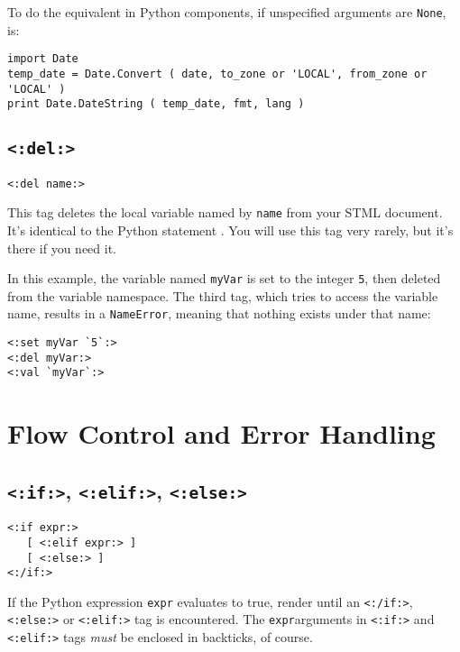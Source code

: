 \documentclass{manual}
\begin{document}
To do the equivalent in Python components, if unspecified arguments are \texttt{None}, is:
\begin{verbatim}
import Date
temp_date = Date.Convert ( date, to_zone or 'LOCAL', from_zone or 'LOCAL' )
print Date.DateString ( temp_date, fmt, lang )
\end{verbatim}






\section{\texttt{<:del:>}}
\label{tagdel}

\begin{verbatim}
<:del name:>
\end{verbatim}

This tag deletes the local variable named by \texttt{name}
from your STML document. It's identical to the Python statement
. You will use this tag very rarely,
but it's there if you need it.

In this example, the variable named \texttt{myVar} is set to
the integer \texttt{5}, then deleted from the variable namespace.
The third tag, which tries to access the variable name, results in
a \texttt{NameError}, meaning that nothing exists under that name:

\begin{verbatim}
<:set myVar `5`:>
<:del myVar:>
<:val `myVar`:>
\end{verbatim}



\chapter{Flow Control and Error Handling}
\label{stmlrefcontrol}


\section{\texttt{<:if:>}, \texttt{<:elif:>}, \texttt{<:else:>}}
\label{tagif}

\begin{verbatim}<:if expr:>
   [ <:elif expr:> ]
   [ <:else:> ]
<:/if:>
\end{verbatim}

If the Python expression \texttt{expr} evaluates to true, 
render until an \texttt{<:/if:>}, \texttt{<:else:>} 
or \texttt{<:elif:>} tag is encountered.  The
\texttt{expr}arguments in  
\texttt{<:if:>} and \texttt{<:elif:>} tags \emph{must} be 
enclosed in backticks, of course.
\end{document}
